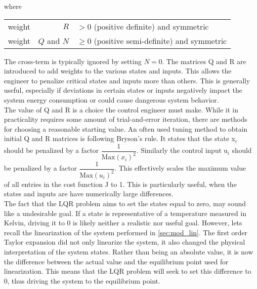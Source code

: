 where

\begin{center}
	\begin{tabular}{l r l }
		weight & $R$         & $ > 0$ (positive definite) and symmetric       \\
		weight & $Q$ and $N$ & $\ge 0$ (positive semi-definite) and symmetric
	\end{tabular}
\end{center}

The cross-term is typically ignored by setting $N=0$. The matrices Q and R are introduced to add weights to the various states and inputs. This allows the engineer to penalize critical states and inputs more than others. This is generally useful, especially if deviations in certain states or inputs negatively impact the system energy consumption or could cause dangerous system behavior.\\

The value of Q and R is a choice the control engineer must make. While it in practicality requires some amount of trial-and-error iteration, there are methods for choosing a reasonable starting value. An often used tuning method to obtain initial Q and R matrices is following Bryson's rule. It states that the state x$_{\textit{i}}$ should be penalized by a factor $\dfrac{1}{\text{Max} \left(x_{\textit{i}}\right)^2}$. Similarly the control input u$_{\textit{i}}$ should be penalized by a factor $\dfrac{1}{\text{Max} \left(u_{\textit{i}}\right)^2}$. This effectively scales the maximum value of all entries in the cost function J to 1. This is particularly useful, when the states and inputs are have numerically large differences.\\


The fact that the LQR problem aims to set the states equal to zero, may sound like a undesirable goal. If a state is representative of a temperature measured in Kelvin, driving it to 0 is likely neither a realistic nor useful goal. However, lets recall the linearization of the system performed in \cref{sec:mod_lin}. The first order Taylor expansion did not only linearize the system, it also changed the physical interpretation of the system states. Rather than being an absolute value, it is now the difference between the actual value and the equilibrium point used for linearization. This means that the LQR problem will seek to set this difference to 0, thus driving the system to the equilibrium point.\\


